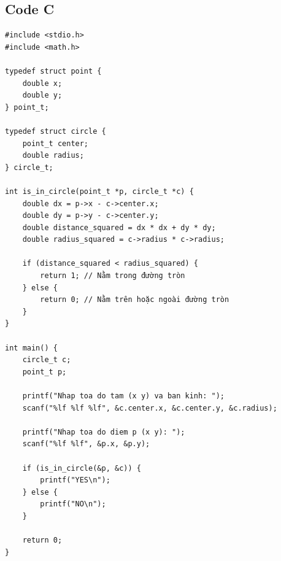 \documentclass[12pt,a4paper]{article}
\begin{document}
\subsection{Code C}
\begin{lstlisting}
#include <stdio.h>
#include <math.h>

typedef struct point {
    double x;
    double y;
} point_t;

typedef struct circle {
    point_t center;
    double radius;
} circle_t;

int is_in_circle(point_t *p, circle_t *c) {
    double dx = p->x - c->center.x;
    double dy = p->y - c->center.y;
    double distance_squared = dx * dx + dy * dy;
    double radius_squared = c->radius * c->radius;
    
    if (distance_squared < radius_squared) {
        return 1; // Nằm trong đường tròn
    } else {
        return 0; // Nằm trên hoặc ngoài đường tròn
    }
}

int main() {
    circle_t c;
    point_t p;
    
    printf("Nhap toa do tam (x y) va ban kinh: ");
    scanf("%lf %lf %lf", &c.center.x, &c.center.y, &c.radius);
    
    printf("Nhap toa do diem p (x y): ");
    scanf("%lf %lf", &p.x, &p.y);
    
    if (is_in_circle(&p, &c)) {
        printf("YES\n");
    } else {
        printf("NO\n");
    }
    
    return 0;
}
\end{lstlisting}
\end{document}
